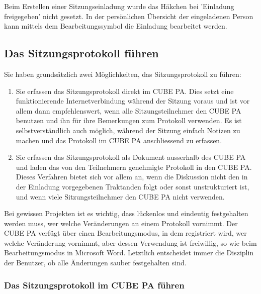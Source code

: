 \begin{small}
Beim Erstellen einer Sitzungseinladung wurde das Häkchen bei 'Einladung freigegeben' nicht gesetzt. In der persönlichen Übersicht der eingeladenen Person kann mittels dem Bearbeitungssymbol die Einladung bearbeitet werden.
\end{small}


\subsection{Das Sitzungsprotokoll führen}

Sie haben grundsätzlich zwei Möglichkeiten, das Sitzungsprotokoll zu führen:

\begin{enumerate}
\item
Sie erfassen das Sitzungsprotokoll direkt im CUBE PA. Dies setzt eine funktionierende Internetverbindung während der Sitzung voraus und ist vor allem dann empfehlenswert, wenn alle Sitzungsteilnehmer den CUBE PA benutzen und ihn für ihre Bemerkungen zum Protokoll verwenden. Es ist selbstverständlich auch möglich, während der Sitzung einfach Notizen
zu machen und das Protokoll im CUBE PA anschliessend zu erfassen.
\item
Sie erfassen das Sitzungsprotokoll als Dokument ausserhalb des CUBE PA und laden das von den Teilnehmern genehmigte Protokoll in den CUBE PA. Dieses Verfahren bietet sich vor allem an, wenn die Diskussion nicht den in der Einladung vorgegebenen Traktanden folgt oder sonst unstrukturiert ist, und wenn viele Sitzungsteilnehmer den CUBE PA nicht
verwenden.
\end{enumerate}

Bei gewissen Projekten ist es wichtig, dass lückenlos und eindeutig festgehalten werden muss, wer welche Veränderungen an einem Protokoll vornimmt. Der CUBE PA verfügt über einen Bearbeitungsmodus, in dem registriert wird, wer welche Veränderung vornimmt, aber dessen Verwendung ist freiwillig, so wie beim Bearbeitungsmodus in Microsoft Word. Letztlich
entscheidet immer die Disziplin der Benutzer, ob alle Änderungen sauber festgehalten sind.

\subsubsection{Das Sitzungsprotokoll im CUBE PA führen}


